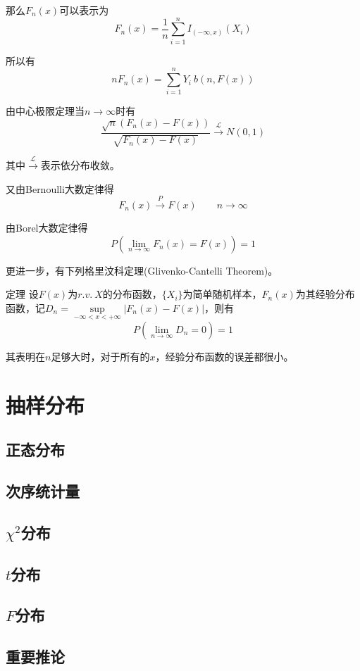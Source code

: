 \documentclass[UTF8]{ctexart}
\begin{document}
那么$F_{n}(x)$可以表示为
$$F_{n}(x)=\frac{1}{n}\sum_{i=1}^{n}I_{(-\infty ,x)}(X_{i}) $$

所以有
$$nF_{n}(x)=\sum_{i=1}^{n}Y_{i}~b(n,F(x)) $$

由中心极限定理当$n\to \infty $时有
$$\frac{\sqrt{n}(F_{n}(x)-F(x))}{\sqrt{F_{n}(x)-F(x)}}\stackrel{\mathcal{L}}{\to } N(0,1) $$

其中$\stackrel{\mathcal{L}}{\to }$表示依分布收敛。

又由Bernoulli大数定律得
$$F_{n}(x)\stackrel{P}{\to}F(x) \qquad n\to \infty $$

由Borel大数定律得
$$P(\lim\limits_{n\to \infty }F_{n}(x)=F(x))=1 $$

更进一步，有下列格里汶科定理(Glivenko-Cantelli Theorem)。

定理 设$F(x)$为$r.v.~X$的分布函数，$\{X_{i}\}$为简单随机样本，$F_{n}(x)$为其经验分布函数，记$D_{n}=\sup\limits_{-\infty <x<+\infty }|F_{n}(x)-F(x)| $，则有
$$P(\lim\limits_{n\to \infty} D_{n}=0)=1 $$

其表明在$n$足够大时，对于所有的$x$，经验分布函数的误差都很小。

\section{抽样分布}

\subsection{正态分布}

\subsection{次序统计量}

\subsection{$\chi^{2} $分布}

\subsection{$t$分布}

\subsection{$F$分布}

\subsection{重要推论}
\end{document}
